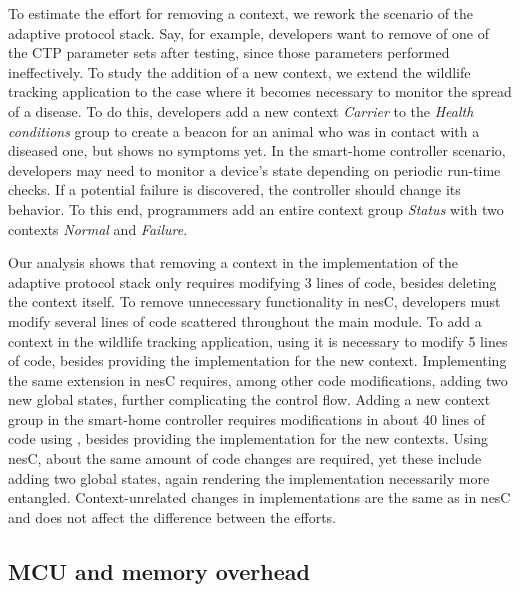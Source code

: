 To estimate the effort for removing a context, we rework the scenario
of the adaptive protocol stack. Say, for example, developers want to
remove of one of the CTP parameter sets after testing, since those
parameters performed ineffectively. To study the addition of a new
context, we extend the wildlife tracking application to the case where
it becomes necessary to monitor the spread of a disease. To do this,
developers add a new context \emph{Carrier} to the \emph{Health
  conditions} group to create a beacon for an animal who was in
contact with a diseased one, but shows no symptoms yet. In the
smart-home controller scenario, developers may need to monitor a
device's state depending on periodic run-time checks. If a potential
failure is discovered, the controller should change its behavior. To
this end, programmers add an entire context group \emph{Status} with
two contexts \emph{Normal} and \emph{Failure}.

 Our analysis shows that removing a context in the \conesc
implementation of the adaptive protocol stack only requires modifying 3 lines of
code, besides deleting the context itself. To remove unnecessary functionality
in nesC, developers must modify several lines of code scattered throughout the
main module. To add a context in the wildlife tracking application, using
\conesc it is necessary to modify 5 lines of code, besides providing the
implementation for the new context. Implementing the same extension in nesC
requires, among other code modifications, adding two new global states, further
complicating the control flow. Adding a new context group in the smart-home
controller requires modifications in about 40 lines of code using \conesc,
besides providing the implementation for the new contexts. Using nesC, about the
same amount of code changes are required, yet these include adding two global
states, again rendering the implementation necessarily more entangled.
Context-unrelated changes in \conesc implementations are the same as in nesC and
does not affect the difference between the efforts.

\vspace{-1px}
\subsection{MCU and memory overhead}\label{sec:overhead}

